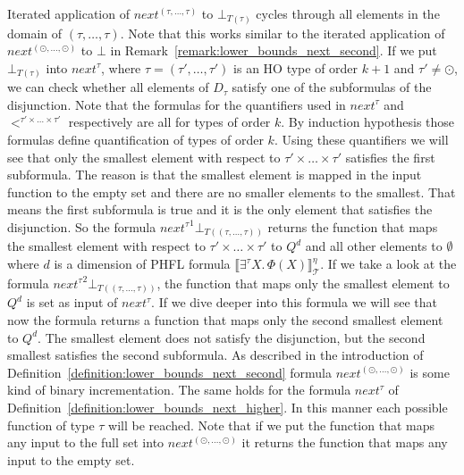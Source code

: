 \begin{remark}
\label{remark:lower_bounds_next_higher}
Iterated application of $next^{(\tau, \dots, \tau)}$ to $\bot_{T(\tau)}$ cycles through all elements in the domain of $(\tau, \dots, \tau)$. Note that this works similar to the iterated application of $next^{(\odot, \dots, \odot)}$ to $\bot$ in Remark~\ref{remark:lower_bounds_next_second}.
    If we put $\bot_{T(\tau)}$ into $next^{\tau}$, where $\tau = (\tau', \dots, \tau')$ is an HO type of order $k+1$ and $\tau'\neq \odot$, we can check whether all elements of $D_{\tau}$  satisfy one of the subformulas of the disjunction. Note that the formulas for the quantifiers used in $next^\tau$ and $<^{\tau'\times\dots\times\tau'}$ respectively are all for types of order $k$. By induction hypothesis those formulas define quantification of types of order $k$. Using these quantifiers we will see that only the smallest element with respect to $\tau'\times\dots\times\tau'$ satisfies the first subformula. 
The reason is that the 
    smallest element is mapped in the input function to the empty set and there are no smaller elements to the smallest. 
    That means the first subformula is true and it is the only element that satisfies the disjunction. So the 
    formula ${next^{\tau}}^1 \bot_{T((\tau, \dots, \tau))}$ returns the function that maps the smallest element with respect to $\tau'\times\dots\times\tau'$ to $Q^d$ and all other elements to $\emptyset$ where $d$ is a dimension of PHFL formula $
    \llbracket \exists^\tau X.\,\Phi(X)\rrbracket^\eta_\mathcal{T}$. If we take a look at the formula $
    {next^{\tau}}^2 \bot_{T((\tau, \dots, \tau))}$, the function that maps only the smallest element to $Q^d$ is set as input of
    $next^{\tau}$. If we dive deeper into this formula we will see that now the formula 
    returns a function that maps only the second smallest element to $Q^d$. The smallest element does not 
    satisfy the disjunction, but the second smallest satisfies the second subformula. As described in the 
    introduction of Definition~\ref{definition:lower_bounds_next_second} formula $next^{(\odot, 
    \dots, \odot)}$ is some kind of binary incrementation. The same holds for the formula $next^\tau$ of Definition~\ref{definition:lower_bounds_next_higher}. In this manner each possible function of 
    type $\tau$ will be reached. Note that if we put the function that maps any input to the full set into $next^{(\odot, 
	\dots, \odot)}$ it returns the function that maps any input to the empty set.
\end{remark}

